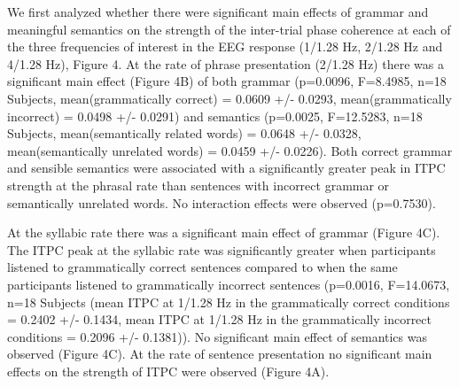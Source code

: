 \documentclass[10pt,letterpaper]{article}
\begin{document}
We first analyzed whether there were significant main effects of grammar and meaningful semantics on the strength of the inter-trial phase coherence at each of the three frequencies of interest in the EEG response (1/1.28 Hz, 2/1.28 Hz and 4/1.28 Hz), Figure 4. At the rate of phrase presentation (2/1.28 Hz) there was a significant main effect (Figure 4B) of both grammar (p=0.0096, F=8.4985, n=18 Subjects, mean(grammatically correct) =  0.0609 +/- 0.0293, mean(grammatically incorrect) = 0.0498 +/- 0.0291) and semantics (p=0.0025, F=12.5283, n=18 Subjects, mean(semantically related words) = 0.0648 +/- 0.0328, mean(semantically unrelated words) = 0.0459 +/- 0.0226). Both correct grammar and sensible semantics were associated with a significantly greater peak in ITPC strength at the phrasal rate than sentences with incorrect grammar or semantically unrelated words. No interaction effects were observed (p=0.7530).

At the syllabic rate there was a significant main effect of grammar (Figure 4C). The ITPC peak at the syllabic rate was significantly greater when participants listened to grammatically correct sentences compared to when the same participants listened to grammatically incorrect sentences (p=0.0016, F=14.0673, n=18 Subjects (mean ITPC at 1/1.28 Hz in the grammatically correct conditions = 0.2402 +/- 0.1434, mean ITPC at 1/1.28 Hz in the grammatically incorrect conditions = 0.2096 +/- 0.1381)). No significant main effect of semantics was observed (Figure 4C). At the rate of sentence presentation no significant main effects on the strength of ITPC were observed (Figure 4A).


\end{document}
